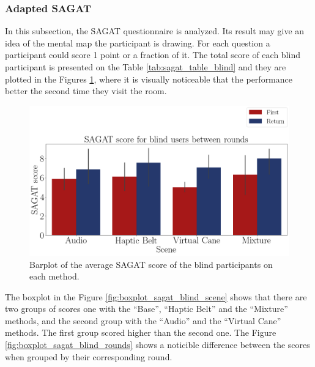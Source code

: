 \subsubsection{Adapted SAGAT}
\label{subsec:results_adapted_sagat}

In this subsection, the SAGAT questionnaire is analyzed. Its result may give an idea of the mental map the participant is drawing. For each question a participant could score 1 point or a fraction of it. The total score of each blind participant is presented on the Table \ref{tab:sagat_table_blind} and they are plotted in the Figures \ref{fig:barplot_sagat_avg_5_scene_blind}, where it is visually noticeable that the performance better the second time they visit the room. 



\begin{figure}[!htb]
    \centering
    \includegraphics[width = 0.8\linewidth]{Resultados/Sagat/Figuras/png/barplot_sagat_avg_5_scene_blind.png}
    \caption{Barplot of the average SAGAT score of the blind participants on each method.}
    \label{fig:barplot_sagat_avg_5_scene_blind}
\end{figure}

The boxplot in the Figure \ref{fig:boxplot_sagat_blind_scene} shows that there are two groups of scores one with the “Base”, “Haptic Belt” and the “Mixture” methods, and the second group with the “Audio” and the “Virtual Cane” methods. The first group scored higher than the second one. The Figure \ref{fig:boxplot_sagat_blind_rounds} shows a noticible difference between the scores when grouped by their corresponding round.

